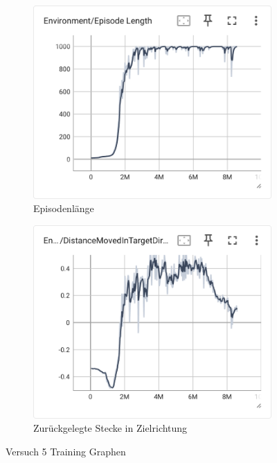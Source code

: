 \begin{figure}[H]
  \centering  
  \begin{subfigure}{.49\textwidth}
      \centering  
      \includegraphics[width=\textwidth]{img/128_episode_length}
      \caption{Episodenlänge}
      \label{fig:128_episode_length}
    \end{subfigure}
    \begin{subfigure}{.49\textwidth}
      \centering  
      \includegraphics[width=\textwidth]{img/128_move_target_dir}
      \caption{Zurückgelegte Stecke in Zielrichtung}
      \label{fig:128_move_target_dir}
    \end{subfigure}
  \caption{Versuch 5 Training Graphen}
  \label{fig:versuch5_training}
\end{figure}

